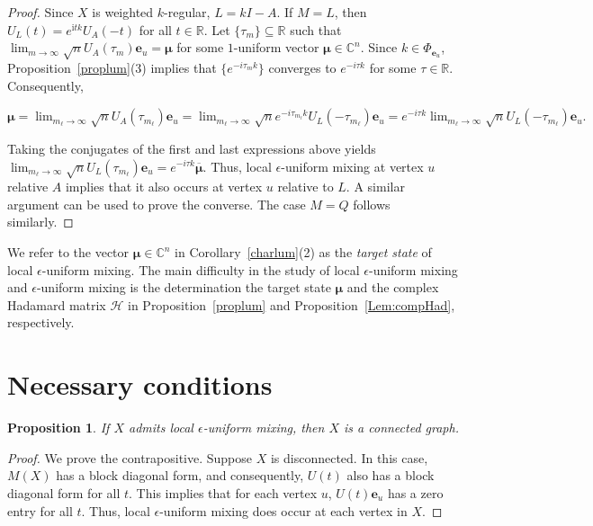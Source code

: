 \documentclass[11pt]{article}
\newtheorem{proposition}{Proposition}
\newcommand{\be}{\mathbf e}
\newcommand{\bmu}{{\boldsymbol{\mu}}}
\def\ii{\mathrm{i}}
\newcommand{\supp}{{\Phi}}
\def\C{\mathbb{C}}
\def\R{\mathbb{R}}
\begin{document}
\begin{proof}
Since $X$ is weighted $k$-regular, $L=kI-A$. If $M=L$, then $U_L(t)=e^{\ii tk}U_A(-t)$ for all $t\in\R$. Let $\{\tau_m\}\subseteq\R$ such that $\displaystyle\lim_{m\rightarrow\infty}\sqrt{n}U_A(\tau_m)\be_u=\bmu$ for some $1$-uniform vector $\bmu\in\C^n$. Since $k\in\supp_{\be_u}$, Proposition~\ref{proplum}(3) implies that $\{e^{-i\tau_mk}\}$ converges to $e^{-i\tau k}$ for some $\tau\in\R$. Consequently, 
\begin{center}
$\displaystyle\bmu=\lim_{m_\ell\rightarrow\infty}\sqrt{n}U_A(\tau_{m_\ell})\be_u=\lim_{m_\ell\rightarrow\infty}\sqrt{n}e^{-i\tau_{m_{\ell}}k}U_L(-\tau_{m_{\ell}})\be_u=e^{-i\tau k}\lim_{m_\ell\rightarrow\infty}\sqrt{n}U_L(-\tau_{m_{\ell}})\be_u.$
\end{center}
Taking the conjugates of the first and last expressions above yields $\displaystyle
\lim_{m_\ell\rightarrow\infty}\sqrt{n}U_L(\tau_{m_{\ell}})\be_u=e^{-i\tau k}\overline{\bmu}.$ Thus, local $\epsilon$-uniform mixing at vertex $u$ relative $A$ implies that it also occurs at vertex $u$ relative to $L$. A similar argument can be used to prove the converse. The case $M=Q$ follows similarly.
\end{proof}

We refer to the vector $\bmu\in\C^n$ in Corollary~\ref{charlum}(2) as the \textit{target state} of local $\epsilon$-uniform mixing. The main difficulty in the study of local $\epsilon$-uniform mixing and $\epsilon$-uniform mixing is the determination the target state $\bmu$ and the complex Hadamard matrix $\mathcal{H}$ in Proposition~\ref{proplum} and Proposition~\ref{Lem:compHad}, respectively.

\section{Necessary conditions}\label{sec:neccon}

\begin{proposition}
\label{prop:conn}
If $X$ admits local $\epsilon$-uniform mixing, then $X$ is a connected graph.
\end{proposition}

\begin{proof}
We prove the contrapositive. Suppose $X$ is disconnected. In this case, $M(X)$ has a block diagonal form, and consequently, $U(t)$ also has a block diagonal form for all $t$. This implies that for each vertex $u$, $U(t)\be_u$ has a zero entry for all $t$. Thus, local $\epsilon$-uniform mixing does occur at each vertex in $X$.
\end{proof}
\end{document}
